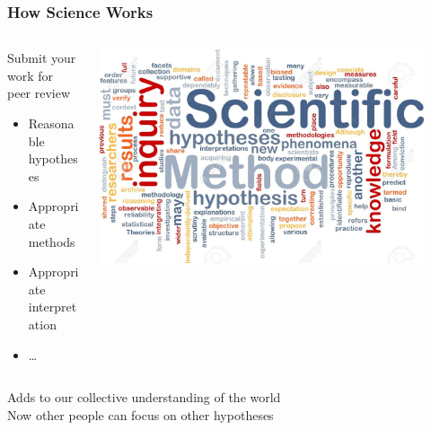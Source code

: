 \documentclass[10pt]{beamer}
\begin{document}
\begin{frame}[t]
\frametitle{How Science Works}
\vspace{0.5cm}

	\begin{columns}
		\begin{column}{0.6\textwidth}
			Submit your work for peer review\\
			\medskip
				\begin{itemize}
					\item Reasonable hypotheses
					\smallskip
					\item Appropriate methods
					\smallskip
					\item Appropriate interpretation
					\smallskip
					\item \ldots
				\end{itemize}
		\end{column}
		
		\begin{column}{0.4\textwidth}
			\begin{center}
				\includegraphics[width=0.9\textwidth]{figures/science3.jpg}\\
			\end{center}
		\end{column}
	\end{columns}
	
	\vspace{0.5cm}
	Adds to our collective understanding of the world\\
	\bigskip
	Now other people can focus on other hypotheses
\end{frame}
\end{document}
